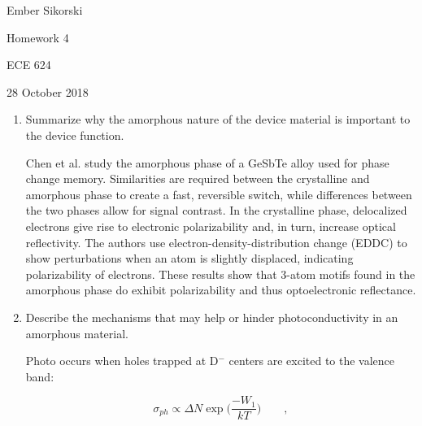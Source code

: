 \documentclass[12pt]{elsarticle}
\newcommand{\vs}{\vspace{2mm}}
\begin{document}
\begin{flushright}
	Ember Sikorski\par
	Homework 4\par
	ECE 624\par 
	28 October 2018
\end{flushright}


\begin{enumerate}
\item  Summarize why the amorphous nature of the device material is important to the device function.
\par \vs 
Chen et al. \cite{Chen2018} study the amorphous phase of a GeSbTe alloy used for phase change memory. Similarities are required between the crystalline and amorphous phase to create a fast, reversible switch, while differences between the two phases allow for signal contrast. In the crystalline phase, delocalized electrons give rise to electronic polarizability and, in turn, increase optical reflectivity.
The authors use electron-density-distribution change (EDDC) to show perturbations when an atom is slightly displaced, indicating polarizability of electrons. These results show that 3-atom motifs found in the amorphous phase do exhibit polarizability and thus optoelectronic reflectance.
\vs 
\item Describe the mechanisms that may help or hinder photoconductivity in an amorphous material.
\par \vs 
Photo occurs when holes trapped at D$^{-}$ centers are excited to the valence band\cite{Street1975}:

\begin{equation}
\sigma_{ph} \propto \Delta N \exp \bigg(\frac{-W_{1}}{kT}\bigg) \qquad ,
\end{equation}


\end{enumerate}
\end{document}
